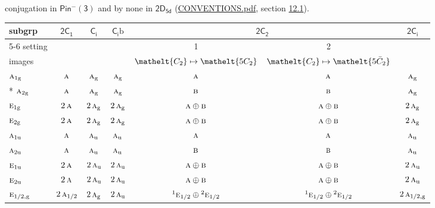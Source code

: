 \documentclass[10pt,a4paper]{article}
\numberwithin{equation}{section}
\newcommand{\eltfont}[1]{{\let\sigma\eltsigma\mathelt{#1}}}
\newcommand{\grp}[1]{\mathsf{#1}}
\newcommand{\irr}[1]{\text{\normalfont\scshape #1}}
\newcommand{\conjpair}[1]{{}^{#1}}
\newcommand{\cls}[1]{\eltfont{#1}}
\newcommand{\ptag}[1]{\mathrm{#1}}
\newcommand{\barred}[1]{\bar{#1}}
\newcommand{\secondclass}{\mathrm{b}}
\begin{document}
conjugation in \href{Pinminus3.pdf}{$\grp{Pin^{-}(3)}$} and by none in $\grp{2D_{5d}}$ (\href{../../CONVENTIONS.pdf}{CONVENTIONS.pdf}, section \href{../../../rotation/CONVENTIONS.pdf\#conv.12.1}{12.1}).
{\small\begin{longtable}{@{}lcccccc@{}}\toprule
subgrp & \href{2C1.pdf}{$\grp{2C_{1}}$} & \href{S2.pdf}{$\grp{C_{i}}$} & \href{S2b.pdf}{$\grp{C_{i}}\secondclass$} & \multicolumn{2}{c}{\href{2C2.pdf}{$\grp{2C_{2}}$}} & \href{2S2.pdf}{$\grp{2C_{i}}$}\\\cmidrule(lr){5-6}
setting &  &  &  & 1 & 2 & \\
images &  &  &  & {\scriptsize $\cls{C_{2}} \mapsto \cls{5C_{2}}$} & {\scriptsize $\cls{C_{2}} \mapsto \cls{5\barred{C}_{2}}$} & \\\midrule\endhead
\bottomrule\endfoot\endlastfoot
$\irr{a}_{1\ptag{g}}$ & $\irr{a}$ & $\irr{a}_{\ptag{g}}$ & $\irr{a}_{\ptag{g}}$ & $\irr{a}$ & $\irr{a}$ & $\irr{a}_{\ptag{g}}$\\*
$\irr{a}_{2\ptag{g}}$ & $\irr{a}$ & $\irr{a}_{\ptag{g}}$ & $\irr{a}_{\ptag{g}}$ & $\irr{b}$ & $\irr{b}$ & $\irr{a}_{\ptag{g}}$\\
$\irr{e}_{1\ptag{g}}$ & $2\,\irr{a}$ & $2\,\irr{a}_{\ptag{g}}$ & $2\,\irr{a}_{\ptag{g}}$ & $\irr{a}\oplus \irr{b}$ & $\irr{a}\oplus \irr{b}$ & $2\,\irr{a}_{\ptag{g}}$\\
$\irr{e}_{2\ptag{g}}$ & $2\,\irr{a}$ & $2\,\irr{a}_{\ptag{g}}$ & $2\,\irr{a}_{\ptag{g}}$ & $\irr{a}\oplus \irr{b}$ & $\irr{a}\oplus \irr{b}$ & $2\,\irr{a}_{\ptag{g}}$\\
$\irr{a}_{1\ptag{u}}$ & $\irr{a}$ & $\irr{a}_{\ptag{u}}$ & $\irr{a}_{\ptag{u}}$ & $\irr{a}$ & $\irr{a}$ & $\irr{a}_{\ptag{u}}$\\
$\irr{a}_{2\ptag{u}}$ & $\irr{a}$ & $\irr{a}_{\ptag{u}}$ & $\irr{a}_{\ptag{u}}$ & $\irr{b}$ & $\irr{b}$ & $\irr{a}_{\ptag{u}}$\\
$\irr{e}_{1\ptag{u}}$ & $2\,\irr{a}$ & $2\,\irr{a}_{\ptag{u}}$ & $2\,\irr{a}_{\ptag{u}}$ & $\irr{a}\oplus \irr{b}$ & $\irr{a}\oplus \irr{b}$ & $2\,\irr{a}_{\ptag{u}}$\\
$\irr{e}_{2\ptag{u}}$ & $2\,\irr{a}$ & $2\,\irr{a}_{\ptag{u}}$ & $2\,\irr{a}_{\ptag{u}}$ & $\irr{a}\oplus \irr{b}$ & $\irr{a}\oplus \irr{b}$ & $2\,\irr{a}_{\ptag{u}}$\\
$\irr{e}_{1/2,\ptag{g}}$ & $2\,\irr{a}_{1/2}$ & $2\,\irr{a}_{\ptag{g}}$ & $2\,\irr{a}_{\ptag{u}}$ & $\conjpair{1}\irr{e}_{1/2}\oplus \conjpair{2}\irr{e}_{1/2}$ & $\conjpair{1}\irr{e}_{1/2}\oplus \conjpair{2}\irr{e}_{1/2}$ & $2\,\irr{a}_{1/2,\ptag{g}}$\\

\end{longtable}}
\end{document}
